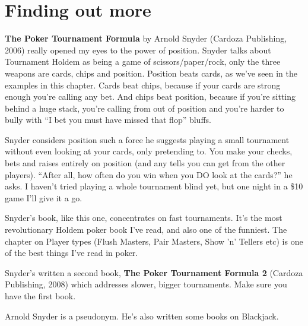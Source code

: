 \section{Finding out more}

\textbf{The Poker Tournament Formula} by Arnold Snyder
(Cardoza Publishing, 2006) really opened my eyes to the power of position.
Snyder talks about
Tournament Holdem as being a game of scissors/paper/rock, only the
three weapons are cards, chips and position. Position beats cards, as we've
seen in the examples in this chapter. Cards beat chips, because if your
cards are strong enough you're calling any bet. And chips beat position,
because if you're sitting behind a huge stack, you're calling
from out of position and you're harder to bully with ``I bet you
must have missed that flop'' bluffs.

Snyder considers position such a force he suggests playing a small
tournament without even looking at your cards, only pretending to. You make
your checks, bets and raises entirely on position (and any tells you can
get from the other players). ``After all, how often do you win when you
DO look at the cards?'' he asks. I haven't tried playing a whole tournament
blind yet, but one night in a \$10 game I'll give it a go.

Snyder's book, like this one, concentrates on fast tournaments. It's
the most revolutionary Holdem poker book I've read, and also one of
the funniest. The chapter on Player types (Flush Masters, Pair Masters,
Show 'n' Tellers etc) is one of the best things I've read in poker.

Snyder's written a second book, \textbf{The Poker Tournament Formula 2}
(Cardoza Publishing, 2008) which addresses slower, bigger
tournaments. Make sure you have the first book.

Arnold Snyder is a pseudonym. He's also written some books on Blackjack.
